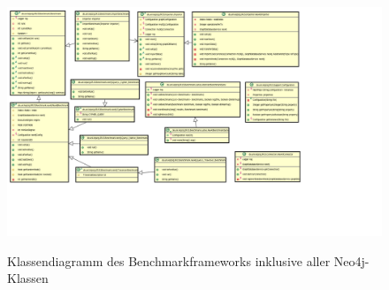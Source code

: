\documentclass[11pt, a4paper, oneside]{article} %
\begin{document}
\begin{appendix}
\begin{landscape} 
	\newpage
	\thispagestyle{empty}
	
	\begin{figure}[ht]
			\centering
			\caption{Klassendiagramm des Benchmarkframeworks inklusive aller Neo4j-Klassen}
			\includegraphics[width=27cm]{pics/class_diagramm_incl_neo4j}
			\label{fig:class_diagramm_neo4j}
	\end{figure}
\end{landscape}

\end{appendix}
\end{document}
